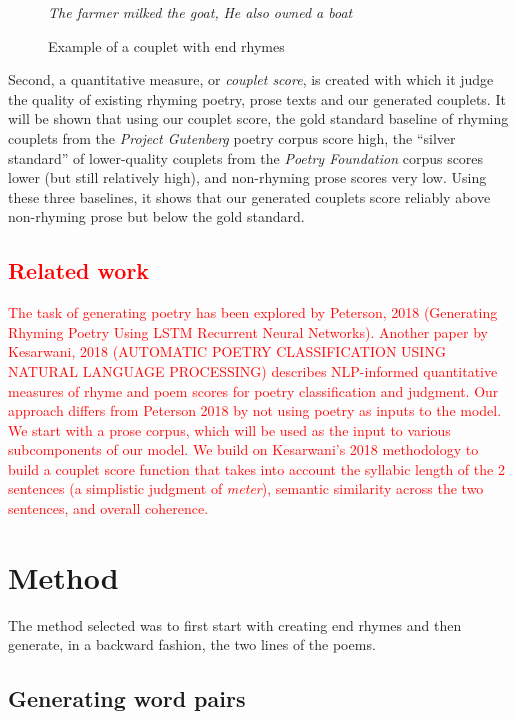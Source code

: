 \documentclass[11pt,a4paper]{article}
\begin{document}
\begin{figure}
	\textit{The farmer milked the goat,} \newline
	\textit{He also owned a boat}
\caption{Example of a couplet with end rhymes}
\label{fig:couplet_example}
\end{figure}

Second, a quantitative measure, or \textit{couplet score}, is created with which it judge the quality of existing rhyming poetry, prose texts and our generated couplets. It will be shown that using our couplet score, the gold standard baseline of rhyming couplets from the \textit{Project Gutenberg} poetry corpus score high, the ``silver standard'' of lower-quality couplets from the \textit{Poetry Foundation} corpus scores lower (but still relatively high), and non-rhyming prose scores very low. Using these three baselines, it shows that our generated couplets score reliably above non-rhyming prose but below the gold standard.

\textcolor{red}{
\section{Related work}
The task of generating poetry has been explored by Peterson, 2018 (Generating Rhyming Poetry Using LSTM Recurrent Neural Networks). Another paper by Kesarwani, 2018 (AUTOMATIC POETRY CLASSIFICATION USING NATURAL LANGUAGE PROCESSING) describes NLP-informed quantitative measures of rhyme and poem scores for poetry classification and judgment.
Our approach differs from Peterson 2018 by not using poetry as inputs to the model. We start with a prose corpus, which will be used as the input to various subcomponents of our model.
We build on Kesarwani's 2018 methodology to build a couplet score function that takes into account the syllabic length of the 2 sentences (a simplistic judgment of \textit{meter}), semantic similarity across the two sentences, and overall coherence.
}

\section{Method}
\label{sec:method}
The method selected was to first start with creating end rhymes and then generate, in a backward fashion, the two lines of the poems.

\subsection{Generating word pairs}
\end{document}
